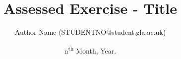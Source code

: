 \documentclass{uofg-exercise}
\begin{document}
\title{Assessed Exercise - Title}
\author{Author Name (STUDENTNO@student.gla.ac.uk)}
\date{n\textsuperscript{th} Month, Year.}
\maketitle



% 
% 

\end{document}
